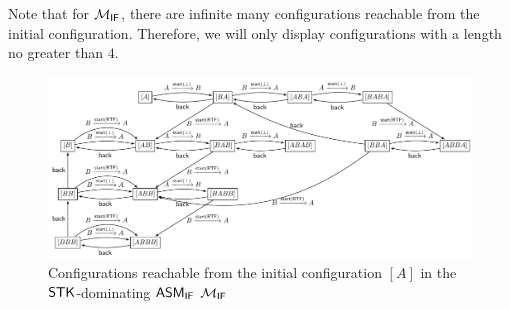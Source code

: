 \begin{example}
\begin{itemize}
	\end{itemize}
	Note that for ${\mathcal{M} }_{\textsf{IF}}$, there are infinite many configurations reachable from the initial configuration. Therefore, we will only display configurations with a length no greater than $4$.

	\begin{figure}
			\centering
			\includegraphics[scale = 0.65]{stk-ifasm-example.pdf}
			\caption{Configurations reachable from the initial configuration $[A]$ in the $\mathsf{STK}$-dominating $\textsf{ASM}_\textsf{IF}$ ${\mathcal{M} }_{\textsf{IF}}$}
		\label{stk-ifasm-example}
	\end{figure}


\end{example}
